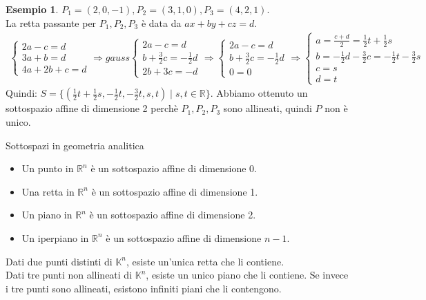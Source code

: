 \documentclass[a4paper]{article}
\theoremstyle{definition}
\newtheorem*{es}{Esempio}
\begin{document}
	\begin{es}
		$P_1 = (2, 0, -1), P_2 = (3, 1, 0), P_3 = (4, 2, 1)$. \\
		La retta passante per $P_1, P_2, P_3$ è data da $ax + by + cz = d$.
		\begin{align*}
			\begin{cases}
				2a - c = d \\
				3a + b = d \\
				4a + 2b + c = d
			\end{cases} \Rightarrow gauss \begin{cases}
				2a - c = d \\
				b + \frac{3}{2}c = -\frac{1}{2}d \\
				2b + 3c = -d
			\end{cases} \Rightarrow \begin{cases}
				2a - c = d \\
				b + \frac{3}{2}c = -\frac{1}{2}d \\
				0 = 0
			\end{cases} \Rightarrow \begin{cases}
				a = \frac{c + d}{2} = \frac{1}{2}t + \frac{1}{2}s \\
				b = -\frac{1}{2}d - \frac{3}{2}c = -\frac{1}{2}t - \frac{3}{2}s \\
				c = s \\
				d = t
			\end{cases}
		\end{align*}
		Quindi: $S = \{(\frac{1}{2}t + \frac{1}{2}s, -\frac{1}{2}t, -\frac{3}{2}t , s, t) \mid s, t \in \mathbb{R}\}$.
		Abbiamo ottenuto un sottospazio affine di dimensione 2 perchè $P_1, P_2, P_3$ sono allineati, quindi $P$ non è unico.
	\end{es}

	\begin{deff}{Sottospazi in geometria analitica}{}
		\begin{itemize}
			\item Un punto in $\mathbb{R}^n$ è un sottospazio affine di dimensione 0.
			\item Una retta in $\mathbb{R}^n$ è un sottospazio affine di dimensione 1.
			\item Un piano in $\mathbb{R}^n$ è un sottospazio affine di dimensione 2.
			\item Un iperpiano in $\mathbb{R}^n$ è un sottospazio affine di dimensione $n - 1$.
		\end{itemize}
		Dati due punti distinti di $\mathbb{K}^n$, esiste un'unica retta che li contiene. \\
		Dati tre punti non allineati di $\mathbb{K}^n$, esiste un unico piano che li contiene.
		Se invece i tre punti sono allineati, esistono infiniti piani che li contengono.
	\end{deff}
\end{document}
